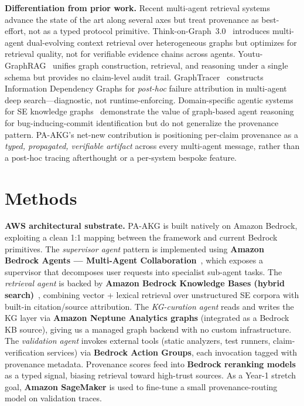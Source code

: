 \documentclass[11pt]{proposalnsf}
\begin{document}
\textbf{Differentiation from prior work.} Recent multi-agent retrieval systems advance the state of the art along several axes but treat provenance as best-effort, not as a typed protocol primitive. Think-on-Graph~3.0~\cite{Wu2025ToG3} introduces multi-agent dual-evolving context retrieval over heterogeneous graphs but optimizes for retrieval quality, not for verifiable evidence chains across agents. Youtu-GraphRAG~\cite{Dong2025YoutuGraphRAG} unifies graph construction, retrieval, and reasoning under a single schema but provides no claim-level audit trail. GraphTracer~\cite{Zhang2025GraphTracer} constructs Information Dependency Graphs for \textit{post-hoc} failure attribution in multi-agent deep search---diagnostic, not runtime-enforcing. Domain-specific agentic systems for SE knowledge graphs~\cite{Shi2026AgenticSZZ} demonstrate the value of graph-based agent reasoning for bug-inducing-commit identification but do not generalize the provenance pattern. PA-AKG's net-new contribution is positioning per-claim provenance as a \textit{typed, propagated, verifiable artifact} across every multi-agent message, rather than a post-hoc tracing afterthought or a per-system bespoke feature.

\section*{\normalsize Methods}

\textbf{AWS architectural substrate.} PA-AKG is built natively on Amazon Bedrock, exploiting a clean 1:1 mapping between the framework and current Bedrock primitives. The \textit{supervisor agent} pattern is implemented using \textbf{Amazon Bedrock Agents — Multi-Agent Collaboration}~\cite{AWSBedrockAgents2026}, which exposes a supervisor that decomposes user requests into specialist sub-agent tasks. The \textit{retrieval agent} is backed by \textbf{Amazon Bedrock Knowledge Bases (hybrid search)}~\cite{AWSBedrockHybridSearch2024}, combining vector + lexical retrieval over unstructured SE corpora with built-in citation/source attribution. The \textit{KG-curation agent} reads and writes the KG layer via \textbf{Amazon Neptune Analytics graphs} (integrated as a Bedrock KB source), giving us a managed graph backend with no custom infrastructure. The \textit{validation agent} invokes external tools (static analyzers, test runners, claim-verification services) via \textbf{Bedrock Action Groups}, each invocation tagged with provenance metadata. Provenance scores feed into \textbf{Bedrock reranking models} as a typed signal, biasing retrieval toward high-trust sources. As a Year-1 stretch goal, \textbf{Amazon SageMaker} is used to fine-tune a small provenance-routing model on validation traces.
\end{document}
